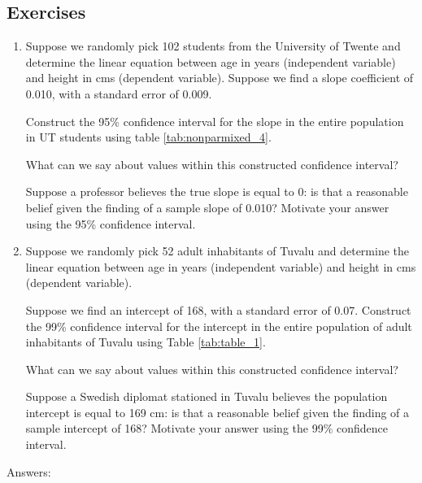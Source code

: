 \documentclass[]{book}\usepackage[]{graphicx}\usepackage[]{color}
\begin{document}
\subsection{Exercises}

\begin{enumerate}


\item Suppose we randomly pick 102 students from the University of Twente and determine the linear equation between age in years (independent variable) and height in cms (dependent variable). Suppose we find a slope coefficient of 0.010, with a standard error of 0.009. 

\subitem Construct the 95\% confidence interval for the slope in the entire population in UT students using table \ref{tab:nonparmixed_4}.

\subitem What can we say about values within this constructed confidence interval?

\subitem Suppose a professor believes the true slope is equal to 0: is that a reasonable belief given the finding of a sample slope of 0.010? Motivate your answer using the 95\% confidence interval.


\item Suppose we randomly pick 52 adult inhabitants of Tuvalu and determine the linear equation between age in years (independent variable) and height in cms (dependent variable). 

\subitem Suppose we find an intercept of 168, with a standard error of 0.07. Construct the 99\% confidence interval for the intercept in the entire population of adult inhabitants of Tuvalu using Table \ref{tab:table_1}.

\subitem What can we say about values within this constructed confidence interval?

\subitem Suppose a Swedish diplomat stationed in Tuvalu believes the population intercept is equal to 169 cm: is that a reasonable belief given the finding of a sample intercept of 168? Motivate your answer using the 99\% confidence interval.




\end{enumerate}


Answers:
\end{document}
